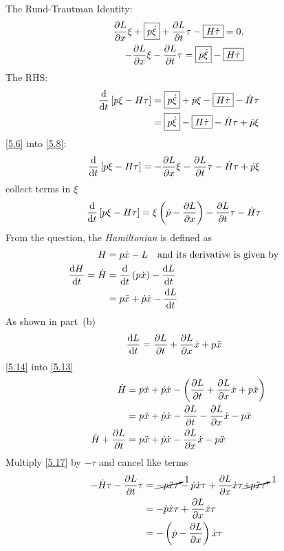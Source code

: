 The Rund-Trautman Identity:
\begin{align}
\label{5.5}
	\frac{\partial L}{\partial x}\xi +  \boxed{p\dot{\xi}} + \frac{\partial L}{\partial t}\tau - \boxed{H\dot{\tau}}=0,\\
\label{5.6}
	-\frac{\partial L}{\partial x}\xi - \frac{\partial L}{\partial t}\tau = \boxed{p\dot{\xi}}  - \boxed{H\dot{\tau}}
\end{align}
The RHS:
\begin{align}
\label{5.7}
	\frac{\mathrm{d}}{\mathrm{d}t}\left[p\xi-H\tau\right] &= \boxed{p\dot{\xi}} +\dot{p}\xi - \boxed{H\dot{\tau}} - \dot{H}\tau\\
\label{5.8}
	&= \boxed{p\dot{\xi}} - \boxed{H\dot{\tau}} - \dot{H}\tau +\dot{p}\xi 
\end{align}
\eqref{5.6} into \eqref{5.8}:
\begin{align}
\label{5.9}
	\frac{\mathrm{d}}{\mathrm{d}t}\left[p\xi-H\tau\right]&= -\frac{\partial L}{\partial x}\xi - \frac{\partial L}{\partial t}\tau  - \dot{H}\tau +\dot{p}\xi 
\end{align}
collect terms in $\xi$
\begin{align}
\label{5.10}
	\frac{\mathrm{d}}{\mathrm{d}t}\left[p\xi-H\tau\right]&=  \xi\left(\dot{p} -\frac{\partial L}{\partial x}\right) - \frac{\partial L}{\partial t}\tau  - \dot{H}\tau
\end{align}
From the question, the \textit{Hamiltonian} is defined as
\begin{align}
\label{5.11}
	H &= p\dot{x} - L\quad\text{and its derivative is given by}\quad\\
\label{5.12}
	\frac{\mathrm{d}H	}{\mathrm{d}t} = \dot{H} &= \frac{\mathrm{d}}{\mathrm{d}t}\left(p\dot{x}\right)-\frac{\mathrm{d}L}{\mathrm{d}t}\\
\label{5.13}
	&= p\ddot{x} +\dot{p}\dot{x} -\frac{\mathrm{d}L}{\mathrm{d}t}
\end{align}
As shown in part~(b)
\begin{align}
\label{5.14}
\frac{\mathrm{d}L}{\mathrm{d}t} &= \frac{\partial L}{\partial t}+\frac{\partial L}{\partial x}\dot{x} + p\ddot{x}
\end{align}
\eqref{5.14} into \eqref{5.13}
\begin{align}
\label{5.15}
	\dot{H} &= p\ddot{x} +\dot{p}\dot{x} -\left(\frac{\partial L}{\partial t}+\frac{\partial L}{\partial x}\dot{x} + p\ddot{x}\right)\\
\label{5.16}
	&= p\ddot{x} +\dot{p}\dot{x} -\frac{\partial L}{\partial t}-\frac{\partial L}{\partial x}\dot{x} - p\ddot{x}\\
\label{5.17}
	\dot{H} + \frac{\partial L}{\partial t} &= p\ddot{x} +\dot{p}\dot{x} -\frac{\partial L}{\partial x}\dot{x} - p\ddot{x}
\end{align}
Multiply \eqref{5.17} by $-\tau$ and cancel like terms
\begin{align}
\label{5.18}
	-\dot{H}\tau - \frac{\partial L}{\partial t}\tau &= \cancelto{1}{-p\ddot{x}\tau} -\dot{p}\dot{x}\tau + \frac{\partial L}{\partial x}\dot{x}\tau \cancelto{1}{+ p\ddot{x}\tau}\\
\label{5.19}
	&=  -\dot{p}\dot{x}\tau + \frac{\partial L}{\partial x}\dot{x}\tau\\
\label{5.20}
	&= - \left(\dot{p} - \frac{\partial L}{\partial x}\right)\dot{x}\tau
\end{align}
